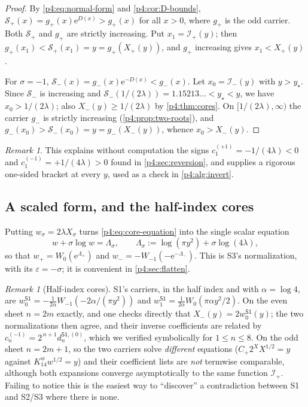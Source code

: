 \documentclass[11pt,a4paper,oneside]{book}
\theoremstyle{plain}
\theoremstyle{definition}
\theoremstyle{remark}
\newtheorem{remark}[theorem]{Remark}
\newcommand{\e}{\mathrm{e}}
\newcommand{\Wlam}{W}
\newcommand{\Xcore}{X}
\begin{document}
\begin{proof}
By \cref{p4:eq:normal-form} and \cref{p4:cor:D-bounds},
$\mathcal S_+(x)=g_+(x)\e^{D(x)}>g_+(x)$ for all $x>0$, where $g_+$ is the
odd carrier.  Both $\mathcal S_+$ and $g_+$ are strictly increasing.  Put
$x_1=\mathcal I_+(y)$; then
$g_+(x_1)<\mathcal S_+(x_1)=y=g_+(\Xcore_+(y))$, and $g_+$ increasing gives
$x_1<\Xcore_+(y)$.

For $\sigma=-1$, $\mathcal S_-(x)=g_-(x)\e^{-D(x)}<g_-(x)$.  Let
$x_0=\mathcal I_-(y)$ with $y>y_\star$.  Since
$\mathcal S_-$ is increasing and $\mathcal S_-(1/(2\lambda))
=1.15213\ldots<y_\star<y$, we have $x_0>1/(2\lambda)$; also
$\Xcore_-(y)\ge1/(2\lambda)$ by \cref{p4:thm:cores}.  On
$[1/(2\lambda),\infty)$ the carrier $g_-$ is strictly increasing
(\cref{p4:prop:two-roots}), and
$g_-(x_0)>\mathcal S_-(x_0)=y=g_-(\Xcore_-(y))$, whence
$x_0>\Xcore_-(y)$.
\end{proof}

\begin{remark}
This explains without computation the signs $c_1^{(+1)}=-1/(4\lambda)<0$ and
$c_1^{(-1)}=+1/(4\lambda)>0$ found in \cref{p4:sec:reversion}, and supplies a
rigorous one-sided bracket at every $y$, used as a check in
\cref{p4:alg:invert}.
\end{remark}

\subsection{A scaled form, and the half-index cores}

Putting $w_\sigma=2\lambda\Xcore_\sigma$ turns \cref{p4:eq:core-equation} into
the single scalar equation
\begin{equation}
  w+\sigma\log w=\Lambda_\sigma,
  \qquad
  \Lambda_\sigma:=\log(\pi y^{2})+\sigma\log(4\lambda),
  \label{p4:eq:scaled-core}
\end{equation}
so that $w_+=\Wlam_0(\e^{\Lambda_+})$ and
$w_-=-\Wlam_{-1}(-\e^{-\Lambda_-})$.  This is \textsf{S3}'s normalization,
with its $\varepsilon=-\sigma$; it is convenient in
\cref{p4:sec:flatten}.

\begin{remark}[Half-index cores]
\label{p4:rem:halfindex-cores}
\textsf{S1}'s carriers, in the half index and with $\alpha=\log4$, are
$w^{\textsf{S1}}_0=-\tfrac1{2\alpha}\Wlam_{-1}(-2\alpha/(\pi y^{2}))$ and
$w^{\textsf{S1}}_1=\tfrac1{2\alpha}\Wlam_0(\pi\alpha y^{2}/2)$.  On the even
sheet $n=2m$ exactly, and one checks directly that
$\Xcore_-(y)=2w^{\textsf{S1}}_0(y)$; the two normalizations then agree, and
their inverse coefficients are related by
$c_n^{(-1)}=2^{\,n+1}d_n^{\textsf{S1},(0)}$, which we verified symbolically
for $1\le n\le8$.  On the odd sheet $n=2m+1$, so the two carriers solve
\emph{different} equations ($C_+2^{X}X^{1/2}=y$ against
$K_14^{w}w^{1/2}=y$) and their coefficient lists are \emph{not} termwise
comparable, although both expansions converge asymptotically to the same
function $\mathcal I_+$.  Failing to notice this is the easiest way to
``discover'' a contradiction between \textsf{S1} and \textsf{S2}/\textsf{S3}
where there is none.
\end{remark}
\end{document}
